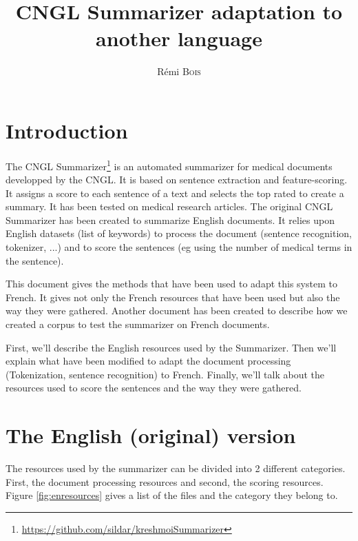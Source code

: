\documentclass[a4paper,10pt]{article}
\title{CNGL Summarizer adaptation to another language}
\author{ Rémi \textsc{Bois}}
\begin{document}
\maketitle

\tableofcontents

\newpage

\section{Introduction}
\label{sec:intro}

The CNGL Summarizer\footnote{\url{https://github.com/sildar/kreshmoiSummarizer}} is an automated summarizer for medical documents
developped by the CNGL. It is based on sentence extraction and
feature-scoring. It assigns a score to each sentence of a text and
selects the top rated to create a summary. It has been tested on
medical research articles. The original CNGL Summarizer has been
created to summarize English documents. It relies upon English
datasets (list of keywords) to process the document (sentence
recognition, tokenizer, ...) and to score the sentences (eg using the
number of medical terms in the sentence).

This document gives the methods that have been used to adapt this
system to French. It gives not only the French resources that have
been used but also the way they were gathered. Another document has
been created to describe how we created a corpus to test the
summarizer on French documents.

First, we'll describe the English resources used by the
Summarizer. Then we'll explain what have been modified to adapt the
document processing (Tokenization, sentence recognition) to
French. Finally, we'll talk about the resources used to score the
sentences and the way they were gathered.

\section{The English (original) version}
\label{sec:english}

The resources used by the summarizer can be divided into 2 different
categories. First, the document processing resources and second, the
scoring resources. Figure \ref{fig:enresources} gives a list of the
files and the category they belong to.
\end{document}
